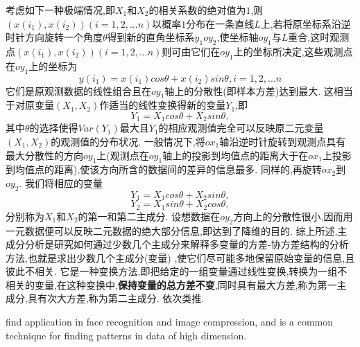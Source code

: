 \documentclass{article}
\begin{document}
考虑如下一种极端情况,即$X_1$和$X_2$的相关系数的绝对值为$1$,则$(x(i_1),x(i_2))(i=1,2,...n)$以概率$1$分布在一条直线$L$上,若将原坐标系沿逆时针方向旋转一个角度$\theta $得到新的直角坐标系$y_1oy_2$,使坐标轴$oy_1$与$L$重合,这时观测点$(x(i_1),x(i_2))(i=1,2,...n)$则可由它们在$oy_1$上的坐标所决定,这些观测点在$oy_1$上的坐标为
$$ y(i_1)=x(i_1)cos\theta +x(i_2)sin\theta ,    i=1,2,...n $$
它们是原观测数据的线性组合且在$oy_1$轴上的分散性(即样本方差)达到最大. 这相当于对原变量$(X_1,X_2)$作适当的线性变换得新的变量$Y_1$,即
$$ Y_1=X_1cos\theta +X_2sin\theta , $$
其中$\theta $的选择使得$Var(Y_1)$最大且$Y_1$的相应观测值完全可以反映原二元变量$(X_1,X_2)$的观测值的分布状况. 一般情况下,将$ox_1$轴沿逆时针旋转到观测点具有最大分散性的方向$oy_1$上(观测点在$oy_1$轴上的投影到均值点的距离大于在$ox_1$上投影到均值点的距离),使该方向所含的数据间的差异的信息最多. 同样的,再旋转$ox_2$到$oy_2$. 我们将相应的变量
$$ Y_1=X_1cos\theta +X_2sin\theta , $$
$$ Y_2=X_1sin\theta +X_2cos\theta , $$
分别称为$X_1$和$X_2$的第一和第二主成分. 设想数据在$oy_2$方向上的分散性很小,因而用一元数据便可以反映二元数据的绝大部分信息,即达到了降维的目的.
综上所述,主成分分析是研究如何通过少数几个主成分来解释多变量的方差-协方差结构的分析方法,也就是求出少数几个主成分(变量) ,使它们尽可能多地保留原始变量的信息,且彼此不相关. 它是一种变换方法,即把给定的一组变量通过线性变换,转换为一组不相关的变量,在这种变换中,\textbf{保持变量的总方差不变},同时具有最大方差,称为第一主成分,具有次大方差,称为第二主成分. 依次类推.

find application in face recognition and image compression, and is a common technique for finding patterns in data of high dimension.
\end{document}
